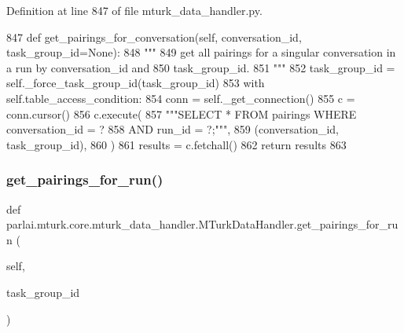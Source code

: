 Definition at line 847 of file mturk\+\_\+data\+\_\+handler.\+py.


\begin{DoxyCode}
847     \textcolor{keyword}{def }get\_pairings\_for\_conversation(self, conversation\_id, task\_group\_id=None):
848         \textcolor{stringliteral}{"""}
849 \textcolor{stringliteral}{        get all pairings for a singular conversation in a run by conversation\_id and}
850 \textcolor{stringliteral}{        task\_group\_id.}
851 \textcolor{stringliteral}{        """}
852         task\_group\_id = self.\_force\_task\_group\_id(task\_group\_id)
853         with self.table\_access\_condition:
854             conn = self.\_get\_connection()
855             c = conn.cursor()
856             c.execute(
857                 \textcolor{stringliteral}{"""SELECT * FROM pairings WHERE conversation\_id = ?}
858 \textcolor{stringliteral}{                         AND run\_id = ?;"""},
859                 (conversation\_id, task\_group\_id),
860             )
861             results = c.fetchall()
862             \textcolor{keywordflow}{return} results
863 
\end{DoxyCode}
\mbox{\label{classparlai_1_1mturk_1_1core_1_1mturk__data__handler_1_1MTurkDataHandler_a546d30ff4b76188f71e5309f7a881ab2}} 
\subsubsection{\texorpdfstring{get\+\_\+pairings\+\_\+for\+\_\+run()}{get\_pairings\_for\_run()}}
{\footnotesize\ttfamily def parlai.\+mturk.\+core.\+mturk\+\_\+data\+\_\+handler.\+M\+Turk\+Data\+Handler.\+get\+\_\+pairings\+\_\+for\+\_\+run (\begin{DoxyParamCaption}\item[{}]{self,  }\item[{}]{task\+\_\+group\+\_\+id }\end{DoxyParamCaption})}

